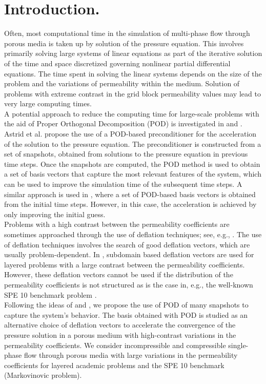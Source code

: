 \documentclass[12pt]{article}
\begin{document}
  \section*{Introduction.}
  \hspace{0.5cm}Often, most computational time in the simulation of multi-phase flow through porous media is taken up by
solution of the pressure equation. This involves primarily solving large systems of linear equations as 
part of the iterative solution of the time and space discretized governing nonlinear partial differential 
equations. The time spent in solving the linear systems depends on the size of the problem and the 
variations of permeability within the medium. Solution of problems with extreme contrast in the grid block 
permeability values may lead to very large computing times.\\
A potential approach to reduce the computing time for large-scale problems with the aid of Proper Orthogonal 
Decomposition (POD) is investigated in \cite{Astrid11} and \cite{Mark06}. Astrid et al. \cite{Astrid11} 
propose the use of a POD-based preconditioner for the acceleration  of the solution to the pressure equation. 
The preconditioner is constructed from a set of snapshots, obtained from solutions to the pressure equation 
in previous time steps. Once the snapshots are computed, the POD method is used to obtain a set of basis 
vectors that capture the most relevant features of the system, which can be used to improve the simulation 
time of the subsequent time steps. A similar approach is used in \cite{Mark06}, where a set of POD-based 
basis vectors is obtained from the initial time steps. However, in this case, the acceleration is 
achieved by only improving the initial guess.\\
Problems with a high contrast between the permeability coefficients are sometimes approached through the 
use of deflation techniques; see, e.g., \cite{Vuik99}. The use of deflation techniques involves the search 
of good deflation vectors, which are usually problem-dependent. In \cite{Vuik99}, subdomain based deflation 
vectors are used for layered problems with a large contrast between the permeability coefficients. However, 
these deflation vectors cannot be used if the distribution of the permeability coefficients  is not 
structured as is the case in, e.g., the well-known SPE 10 benchmark problem \cite{Christie01}.\\
Following the ideas of \cite{Astrid11} and \cite{Mark06}, we propose the use of POD of many snapshots to capture 
the system's behavior. The basis obtained with POD is studied as an alternative choice of deflation vectors 
to accelerate the convergence of the pressure solution in a porous medium with high-contrast variations in the 
permeability coefficients. We consider incompressible and compressible single-phase flow through porous media 
with large variations in the permeability coefficients for layered academic problems and the SPE 10 benchmark (Markovinovic problem). 
\\
\end{document}
